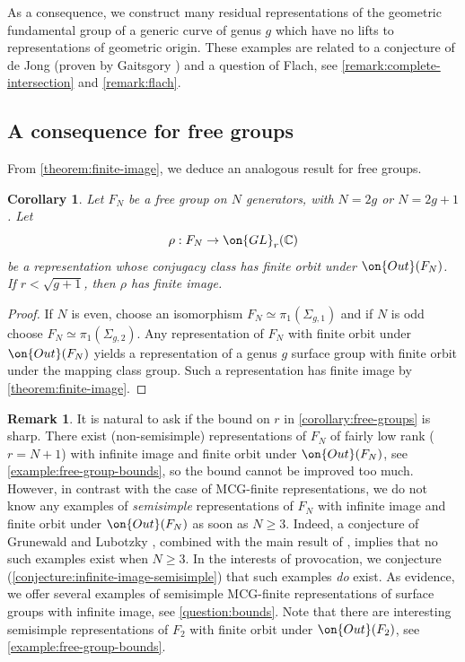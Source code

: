 \documentclass[12 pt]{amsart}
\theoremstyle{plain}
\newtheorem{corollary}[subsubsection]{Corollary}
\theoremstyle{definition}
\newtheorem{remark}[subsubsection]{Remark}
\theoremstyle{remark}
\numberwithin{equation}{section}
\begin{document}
As a consequence, we construct many residual
representations of the geometric fundamental group of a generic curve of genus
$g$ which have no lifts to representations of geometric origin. These examples are related to a conjecture of de Jong \cite{de2001conjecture} (proven by Gaitsgory \cite{gaitsgory2007jong}) and a question of Flach, see \autoref{remark:complete-intersection} and \autoref{remark:flach}. 


\subsection{A consequence for free groups}
\label{subsection:free-groups}

From \autoref{theorem:finite-image}, we deduce an analogous result for free groups.
\begin{corollary}\label{corollary:free-groups}
	Let $F_N$ be a free group on $N$ generators, with $N=2g$ or $N=2g+1$.
	Let $$\rho: F_N\to \on{GL}_r(\mathbb{C})$$ be a representation whose conjugacy class has finite orbit under $\on{Out}(F_N)$. If $r<\sqrt{g+1}$, then $\rho$ has finite image.
\end{corollary}
\begin{proof}
	If $N$ is even, choose an isomorphism $F_N\simeq \pi_1(\Sigma_{g,1})$
	and if $N$ is odd choose $F_N\simeq \pi_1(\Sigma_{g,2})$. Any
	representation of $F_N$ with finite orbit under $\on{Out}(F_N)$ yields a
	representation of a genus $g$ surface group with finite orbit under the
	mapping class group. Such a representation has finite image by \autoref{theorem:finite-image}.
\end{proof}
\begin{remark}
It is natural to ask if the bound on $r$ in \autoref{corollary:free-groups} is sharp. 
There exist (non-semisimple) representations of $F_N$ of fairly low rank ($r =N + 1$) with infinite image and finite orbit under $\on{Out}(F_N)$, see 
\autoref{example:free-group-bounds}, so the bound cannot be improved too much. 
However, in contrast with the case of MCG-finite representations, we do not know any examples of \emph{semisimple} representations of $F_N$ with infinite image and finite orbit under $\on{Out}(F_N)$ as soon as $N\geq 3$.
Indeed, a conjecture of Grunewald and Lubotzky \cite[Conjecture in
\S9.2]{grunewald2009linear}, combined with the main result of
\cite{farb2017moving}, implies that no such examples exist when $N \geq 3$. In the interests of provocation, we conjecture 
(\autoref{conjecture:infinite-image-semisimple})
that such examples \emph{do} exist. 
As evidence, we offer several examples of semisimple MCG-finite representations of surface groups with infinite image, see \autoref{question:bounds}. Note that there are interesting semisimple representations of $F_2$ with finite orbit under $\on{Out}(F_2)$, see \autoref{example:free-group-bounds}.
\end{remark}
\end{document}
